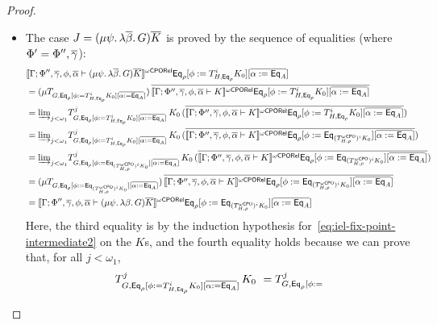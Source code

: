 \documentclass[acmsmall,review,anonymous]{acmart}
\theoremstyle{definition}
\begin{document}
\begin{proof}
\begin{itemize}
\begin{itemize}
\item 
The case $J = (\mu \psi.\, \lambda \overline{\beta}.\, G) \overline{K}$
is proved by the sequence of equalities (where $\Phi' = \Phi'', \overline{\gamma}$):
\[
\begin{split}
& \oCPORsem{\Gamma; \Phi'', \ol\gamma, \phi, \ol{\alpha} \vdash (\mu \psi.\, \lambda \ol{\beta}.\, G) \ol{K}}
  \Eq_{\rho} [\phi := T^i_{H,\Eq_{\rho}} K_0]
  [\overline{\alpha := \Eq_A}] \\
&= (\mu {T_{G, \Eq_{\rho}[\phi := T^i_{H,\Eq_{\rho}} K_0][\overline{\alpha := \Eq_A}]}})
  \,\ol{\oCPORsem{\Gamma; \Phi'', \ol\gamma, \phi, \ol{\alpha} \vdash K}\Eq_{\rho}
  [\phi := T^i_{H,\Eq_{\rho}} K_0][\overline{\alpha := \Eq_A}]} \\ 
&= \colim{j < \omega_1} {T^j_{G, \Eq_{\rho}[\phi := T^{i}_{H,\Eq_{\rho}} K_0][\overline{\alpha := \Eq_A}]}}\,K_0
  \,(\ol{\oCPORsem{\Gamma; \Phi'', \ol\gamma, \phi, \ol{\alpha} \vdash K}\Eq_{\rho}
  [\phi := T^{i}_{H,\Eq_{\rho}} K_0][\overline{\alpha := \Eq_A}]}) \\ 
&= \colim{j < \omega_1} {T^j_{G, \Eq_{\rho}[\phi := T^{i}_{H,\Eq_{\rho}} K_0][\overline{\alpha := \Eq_A}]}}\,K_0
  \,(\ol{\oCPORsem{\Gamma; \Phi'', \ol\gamma, \phi, \ol{\alpha} \vdash K}\Eq_{\rho}
  [\phi := \Eq_{(T^{\oCPO}_{H,\rho})^i K_0}][\overline{\alpha := \Eq_A}]}) \\  %
&= \colim{j < \omega_1} {T^j_{G, \Eq_{\rho}[\phi := \Eq_{(T^{\oCPO}_{H,\rho})^i K_0}][\overline{\alpha := \Eq_A}]}}\,K_0
  \,(\ol{\oCPORsem{\Gamma; \Phi'', \ol\gamma, \phi, \ol{\alpha} \vdash K}\Eq_{\rho}
  [\phi := \Eq_{(T^{\oCPO}_{H,\rho})^i K_0}][\overline{\alpha := \Eq_A}]}) \\ 
&= (\mu {T_{G, \Eq_{\rho}[\phi := \Eq_{(T^{\oCPO}_{H,\rho})^i K_0}][\overline{\alpha := \Eq_A}]}})
  \,\ol{\oCPORsem{\Gamma; \Phi'', \ol\gamma, \phi, \ol{\alpha} \vdash K}\Eq_{\rho}
  [\phi := \Eq_{(T^{\oCPO}_{H,\rho})^i K_0}][\overline{\alpha := \Eq_A}]} \\ 
&= \oCPORsem{\Gamma; \Phi'', \ol\gamma, \phi, \ol{\alpha} \vdash (\mu \psi.\, \lambda \beta.\, G) \ol{K}}
  \Eq_{\rho}[\phi := \Eq_{(T^{\oCPO}_{H,\rho})^i K_0}][\overline{\alpha := \Eq_{A}}]
\end{split}
\]
Here, the third equality is by the induction hypothesis
for~\eqref{eq:iel-fix-point-intermediate2} on the $K$s, and the fourth
equality holds because we can prove that, for all $j < \omega_1$,
\begin{equation}\label{eq:helper}
T^j_{G,
\mathsf{Eq}_{\rho}[\phi := T^i_{H,\mathsf{Eq}_{\rho}} K_0][\overline{\alpha :=
    \mathsf{Eq}_A}]}\,K_0 \ = T^j_{G, \mathsf{Eq}_{\rho}[\phi :=
}
\end{equation}
\end{itemize}
\end{itemize}
\end{proof}
\end{document}
